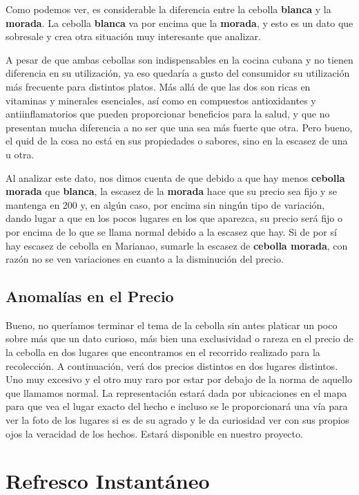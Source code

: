 \documentclass[a4paper,12pt]{article}
\begin{document}
Como podemos ver, es considerable la diferencia entre la cebolla \textbf{blanca} y la \textbf{morada}. 
La cebolla \textbf{blanca} va por encima que la \textbf{morada}, y esto es un dato que sobresale y crea otra situación muy interesante que analizar.

A pesar de que ambas cebollas son indispensables en la cocina cubana y no tienen diferencia en su utilización, ya eso quedaría a gusto del consumidor su utilización más frecuente para distintos platos. 
Más allá de que las dos son ricas en vitaminas y minerales esenciales, así como en compuestos antioxidantes y antiinflamatorios que pueden proporcionar beneficios para la salud, y que no presentan mucha diferencia a no ser que una sea más fuerte que otra. 
Pero bueno, el quid de la cosa no está en sus propiedades o sabores, sino en la escasez de una u otra.

Al analizar este dato, nos dimos cuenta de que debido a que hay menos \textbf{cebolla morada} que \textbf{blanca}, la escasez de la \textbf{morada} hace que su precio sea fijo y se mantenga en 200 y, en algún caso, por encima sin ningún tipo de variación, dando lugar a que en los pocos lugares en los que aparezca, su precio será fijo o por encima de lo que se llama normal debido a la escasez que hay. 
Si de por sí hay escasez de cebolla en Marianao, sumarle la escasez de \textbf{cebolla morada}, con razón no se ven variaciones en cuanto a la disminución del precio.

\subsection{Anomalías en el Precio}
Bueno, no queríamos terminar el tema de la cebolla sin antes platicar un poco sobre más que un dato curioso, más bien una exclusividad o rareza en el precio de la cebolla en dos lugares que encontramos en el recorrido realizado para la recolección. 
A continuación, verá dos precios distintos en dos lugares distintos. 
Uno muy excesivo y el otro muy raro por estar por debajo de la norma de aquello que llamamos normal. 
La representación estará dada por ubicaciones en el mapa para que vea el lugar exacto del hecho e incluso se le proporcionará una vía para ver la foto de los lugares si es de su agrado y le da curiosidad ver con sus propios ojos la veracidad de los hechos.
Estará disponible en nuestro proyecto.

\section{Refresco Instantáneo}
\end{document}
